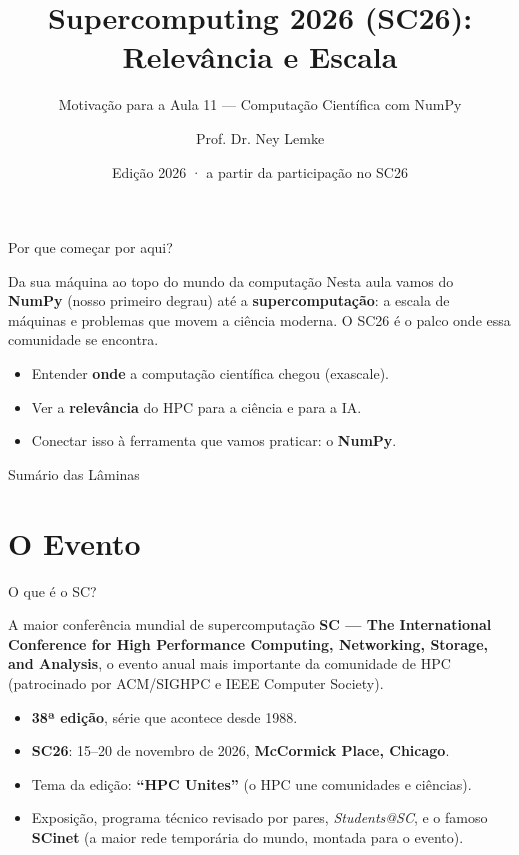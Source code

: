 \documentclass[aspectratio=169, 10pt]{beamer}
\title[SC26 — Supercomputing 2026]{Supercomputing 2026 (SC26): Relevância e Escala}
\subtitle{Motivação para a Aula 11 — Computação Científica com NumPy}
\author{Prof. Dr. Ney Lemke}
\institute{UNESP -- Instituto de Biociências de Botucatu}
\date{Edição 2026 · a partir da participação no SC26}
\begin{document}
\frame{\titlepage}

\begin{frame}{Por que começar por aqui?}
  \begin{block}{Da sua máquina ao topo do mundo da computação}
    Nesta aula vamos do \textbf{NumPy} (nosso primeiro degrau) até a \textbf{supercomputação}:
    a escala de máquinas e problemas que movem a ciência moderna. O SC26 é o palco onde
    essa comunidade se encontra.
  \end{block}
  \begin{itemize}
    \item Entender \textbf{onde} a computação científica chegou (exascale).
    \item Ver a \textbf{relevância} do HPC para a ciência e para a IA.
    \item Conectar isso à ferramenta que vamos praticar: o \textbf{NumPy}.
  \end{itemize}
\end{frame}

\begin{frame}{Sumário das Lâminas}
  \tableofcontents
\end{frame}

\section{O Evento}

\begin{frame}{O que é o SC?}
  \begin{block}{A maior conferência mundial de supercomputação}
    \textbf{SC — The International Conference for High Performance Computing, Networking,
    Storage, and Analysis}, o evento anual mais importante da comunidade de HPC
    (patrocinado por ACM/SIGHPC e IEEE Computer Society).
  \end{block}
  \begin{itemize}
    \item \textbf{38ª edição}, série que acontece desde 1988.
    \item \textbf{SC26}: 15--20 de novembro de 2026, \textbf{McCormick Place, Chicago}.
    \item Tema da edição: \textbf{``HPC Unites''} (o HPC une comunidades e ciências).
    \item Exposição, programa técnico revisado por pares, \emph{Students@SC},
          e o famoso \textbf{SCinet} (a maior rede temporária do mundo, montada para o evento).
  \end{itemize}
\end{frame}
\end{document}
